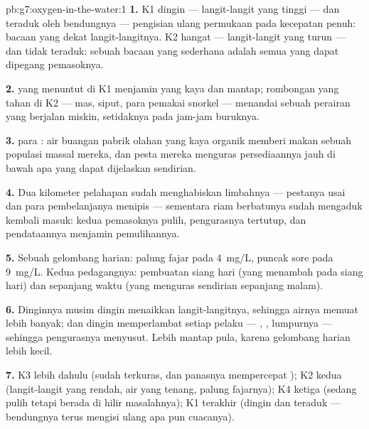 \begin{solution}{pb:g7:oxygen-in-the-water:1}
\textbf{1.} K1 dingin --- langit-langit yang tinggi --- dan teraduk
oleh bendungnya --- pengisian ulang permukaan pada kecepatan penuh:
bacaan yang dekat langit-langitnya. K2 hangat --- langit-langit yang
turun --- dan tidak teraduk: sebuah bacaan yang sederhana adalah semua
yang dapat dipegang pemasoknya.

\textbf{2.}  yang menuntut di K1 menjamin  yang kaya dan
mantap; rombongan yang tahan di K2 ---  mas, siput, para pemakai
snorkel --- menandai sebuah perairan yang berjalan miskin, setidaknya
pada jam-jam buruknya.

\textbf{3.}  para : air buangan pabrik olahan
 yang kaya organik memberi makan sebuah populasi massal
mereka, dan pesta mereka menguras persediaannya jauh di bawah apa yang
dapat dijelaskan  sendirian.

\textbf{4.} Dua kilometer pelahapan sudah menghabiskan limbahnya ---
pestanya usai dan para pembelanjanya menipis --- sementara riam
berbatunya sudah mengaduk  kembali masuk: kedua pemasoknya
pulih, pengurasnya tertutup, dan pendataannya menjamin pemulihannya.

\textbf{5.} Sebuah gelombang harian: palung fajar pada \qty{4}{mg/L},
puncak sore pada \qty{9}{mg/L}. Kedua pedagangnya: pembuatan siang
hari (yang menambah pada siang hari) dan  sepanjang waktu
(yang menguras sendirian sepanjang malam).

\textbf{6.} Dinginnya musim dingin menaikkan langit-langitnya,
sehingga airnya memuat lebih banyak; dan dingin memperlambat setiap
pelaku  --- , ,  lumpurnya --- sehingga
pengurasnya menyusut. Lebih mantap pula, karena gelombang harian
 lebih kecil.

\textbf{7.} K3 lebih dahulu (sudah terkuras, dan panasnya mempercepat
); K2 kedua (langit-langit yang rendah, air yang tenang,
palung fajarnya); K4 ketiga (sedang pulih tetapi berada di hilir
masalahnya); K1 terakhir (dingin dan teraduk --- bendungnya terus
mengisi ulang apa pun cuacanya).


\end{solution}
